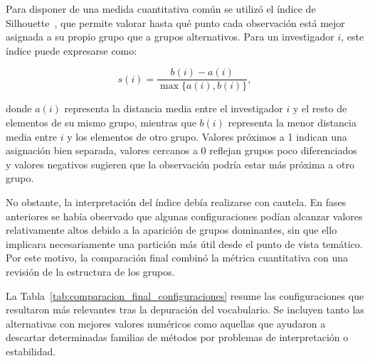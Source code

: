 \documentclass[11pt,spanish,listoffigures,listoftables]{tfgetsinf}
\begin{document}
Para disponer de una medida cuantitativa común se utilizó el índice de Silhouette~\cite{rousseeuw}, que permite valorar hasta qué punto cada observación está mejor asignada a su propio grupo que a grupos alternativos. Para un investigador \(i\), este índice puede expresarse como:

\[
s(i) = \frac{b(i) - a(i)}{\max\{a(i), b(i)\}},
\]

donde \(a(i)\) representa la distancia media entre el investigador \(i\) y el resto de elementos de su mismo grupo, mientras que \(b(i)\) representa la menor distancia media entre \(i\) y los elementos de otro grupo. Valores próximos a 1 indican una asignación bien separada, valores cercanos a 0 reflejan grupos poco diferenciados y valores negativos sugieren que la observación podría estar más próxima a otro grupo.

No obstante, la interpretación del índice debía realizarse con cautela. En fases anteriores se había observado que algunas configuraciones podían alcanzar valores relativamente altos debido a la aparición de grupos dominantes, sin que ello implicara necesariamente una partición más útil desde el punto de vista temático. Por este motivo, la comparación final combinó la métrica cuantitativa con una revisión de la estructura de los grupos.

La Tabla~\ref{tab:comparacion_final_configuraciones} resume las configuraciones que resultaron más relevantes tras la depuración del vocabulario. Se incluyen tanto las alternativas con mejores valores numéricos como aquellas que ayudaron a descartar determinadas familias de métodos por problemas de interpretación o estabilidad.
\end{document}
